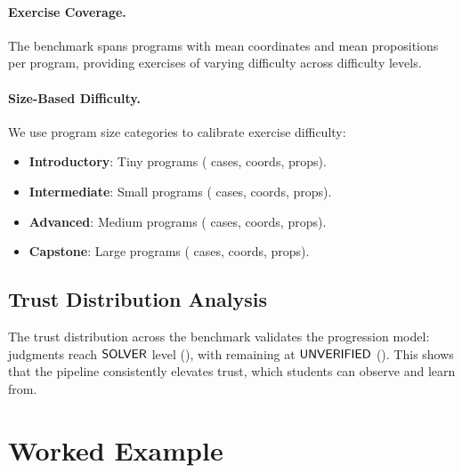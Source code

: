 \documentclass[11pt]{article}
\begin{document}
\paragraph{Exercise Coverage.}
The benchmark spans programs with \ppLXVIcoordsMean{} mean coordinates
and \ppLXVIpropsMean{} mean propositions per program,
providing exercises of varying difficulty across
\ppLXVIlevelCount{} difficulty levels.

\paragraph{Size-Based Difficulty.}
We use program size categories to calibrate exercise difficulty:
\begin{itemize}[leftmargin=*]
  \item \textbf{Introductory}: Tiny programs (\compTinyCount{} cases,
        \compTinyMeanCoords{} coords, \compTinyMeanProps{} props).
  \item \textbf{Intermediate}: Small programs (\compSmallCount{} cases,
        \compSmallMeanCoords{} coords, \compSmallMeanProps{} props).
  \item \textbf{Advanced}: Medium programs (\compMediumCount{} cases,
        \compMediumMeanCoords{} coords, \compMediumMeanProps{} props).
  \item \textbf{Capstone}: Large programs (\compLargeCount{} cases,
        \compLargeMeanCoords{} coords, \compLargeMeanProps{} props).
\end{itemize}

\subsection{Trust Distribution Analysis}

The trust distribution across the benchmark validates the progression model:
\compTrustSolverdischarged{} judgments reach $\mathsf{SOLVER}$ level
(\compTrustSolverdischargedPct{}), with \compTrustUnverified{} remaining at
$\mathsf{UNVERIFIED}$ (\compTrustUnverifiedPct{}). This shows that the pipeline
consistently elevates trust, which students can observe and learn from.

\section{Worked Example}\label{sec:worked-example}
\end{document}
